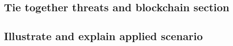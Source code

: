 
\subsection{Tie together threats and blockchain section}
\subsection{Illustrate and explain applied scenario}
